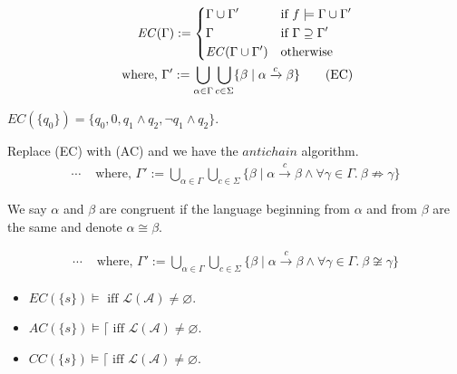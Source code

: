\begin{definition}
  \begin{align*}
    \mathit{EC}(\Gamma) :=
    \begin{dcases}
    \Gamma \cup \Gamma'              &\text{if } f \models \Gamma \cup \Gamma'
    \\
    \Gamma                           &\text{if } \Gamma \supseteq \Gamma'
    \\
    \mathit{EC}(\Gamma \cup \Gamma') &\text{otherwise } 
    \end{dcases}
    \\
    \text{ where, } \Gamma' :=
    \bigcup\limits_{\alpha \in \Gamma}
    \bigcup\limits_{c \in \Sigma}
    \{ \beta \mid \alpha \xrightarrow[]c \beta \}
    \tag{EC}
  \end{align*}
\end{definition}

\begin{example}
\( \mathit{EC}(\{ q_0 \}) = \{ q_0, 0, q_1 \wedge q_2, \neg q_1 \wedge q_2 \} \).
\end{example}

\begin{definition}
Replace (EC) with (AC) and we have the \( \mathit{antichain} \) algorithm. 
    \begin{align*} \cdots & \text{ where, } \Gamma' :=
    \bigcup\limits_{\alpha \in \Gamma}
    \bigcup\limits_{c \in \Sigma}
    \{
    \beta \mid \alpha \xrightarrow[]c \beta
    \wedge
    \forall \gamma \in \Gamma .\ \beta \not \Rightarrow \gamma
    \}
    \tag{AC}
    \end{align*}
\end{definition}

We say \( \alpha \) and \( \beta \) are congruent if the language beginning from
\( \alpha \) and from \( \beta \) are the same and denote \( \alpha \cong
\beta\).

\begin{definition}
  \begin{align*} \cdots & \text{ where, } \Gamma' :=
    \bigcup\limits_{\alpha \in \Gamma}
    \bigcup\limits_{c \in \Sigma}
    \{
    \beta \mid \alpha \xrightarrow[]c \beta
    \wedge
    \forall \gamma \in \Gamma .\ \beta \not \cong \gamma
    \}
    \tag{CC}
  \end{align*}
\end{definition}

\begin{theorem}
  \begin{itemize}
  \item \(EC(\{s\}) \models \text{ iff }
    \mathcal{L}(\mathcal{A}) \neq \varnothing. \)
  \item \(AC(\{s\}) \models \lceil \text{ iff }
    \mathcal{L}(\mathcal{A}) \neq \varnothing. \)
  \item \(CC(\{s\}) \models \lceil \text{ iff }
    \mathcal{L}(\mathcal{A}) \neq \varnothing. \)
\end{itemize}
\end{theorem}
\fi
